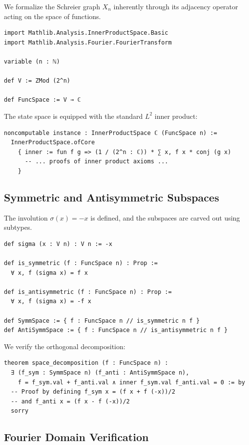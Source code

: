 \documentclass[11pt, a4paper]{article}
\theoremstyle{definition}
\begin{document}
We formalize the Schreier graph $X_n$ inherently through its adjacency operator acting on the space of functions.

\begin{lstlisting}[language=lean]
import Mathlib.Analysis.InnerProductSpace.Basic
import Mathlib.Analysis.Fourier.FourierTransform

variable (n : ℕ)

def V := ZMod (2^n)

def FuncSpace := V → ℂ
\end{lstlisting}

The state space is equipped with the standard $L^2$ inner product:

\begin{lstlisting}[language=lean]
noncomputable instance : InnerProductSpace ℂ (FuncSpace n) :=
  InnerProductSpace.ofCore
    { inner := fun f g => (1 / (2^n : ℂ)) * ∑ x, f x * conj (g x)
      -- ... proofs of inner product axioms ...
    }
\end{lstlisting}

\subsection{Symmetric and Antisymmetric Subspaces}

The involution $\sigma(x) = -x$ is defined, and the subspaces are carved out using subtypes.

\begin{lstlisting}[language=lean]
def sigma (x : V n) : V n := -x

def is_symmetric (f : FuncSpace n) : Prop :=
  ∀ x, f (sigma x) = f x

def is_antisymmetric (f : FuncSpace n) : Prop :=
  ∀ x, f (sigma x) = -f x

def SymmSpace := { f : FuncSpace n // is_symmetric n f }
def AntiSymmSpace := { f : FuncSpace n // is_antisymmetric n f }
\end{lstlisting}

We verify the orthogonal decomposition:

\begin{lstlisting}[language=lean]
theorem space_decomposition (f : FuncSpace n) :
  ∃ (f_sym : SymmSpace n) (f_anti : AntiSymmSpace n),
    f = f_sym.val + f_anti.val ∧ inner f_sym.val f_anti.val = 0 := by
  -- Proof by defining f_sym x = (f x + f (-x))/2
  -- and f_anti x = (f x - f (-x))/2
  sorry
\end{lstlisting}

\subsection{Fourier Domain Verification}
\end{document}
